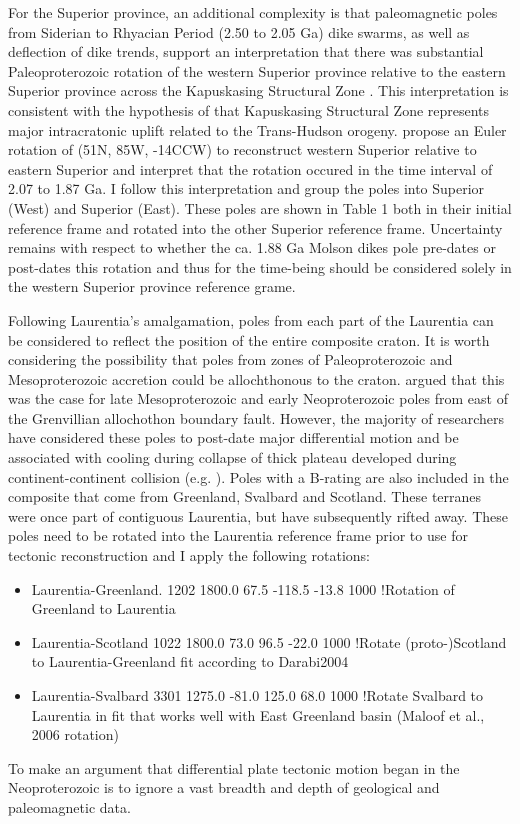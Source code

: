 \documentclass[11pt,letterpaper]{article}
\begin{document}
For the Superior province, an additional complexity is that paleomagnetic poles from Siderian to Rhyacian Period (2.50 to 2.05 Ga) dike swarms, as well as deflection of dike trends, support an interpretation that there was substantial Paleoproterozoic rotation of the western Superior province relative to the eastern Superior province across the Kapuskasing Structural Zone \citep{Bates1991a, Evans2010a}. This interpretation is consistent with the hypothesis of \citet{Hoffman1988a} that Kapuskasing Structural Zone represents major intracratonic uplift related to the Trans-Hudson orogeny. \cite{Evans2010a} propose an Euler rotation of (51\textdegree N, 85\textdegree W, -14\textdegree CCW) to reconstruct western Superior relative to eastern Superior and interpret that the rotation occured in the time interval of 2.07 to 1.87 Ga.  I follow this interpretation and group the poles into Superior (West) and Superior (East). These poles are shown in Table 1 both in their initial reference frame and rotated into the other Superior reference frame. Uncertainty remains with respect to whether the ca. 1.88 Ga Molson dikes pole pre-dates or post-dates this rotation and thus for the time-being should be considered solely in the western Superior province reference grame. 

Following Laurentia's amalgamation, poles from each part of the Laurentia can be considered to reflect the position of the entire composite craton. It is worth considering the possibility that poles from zones of Paleoproterozoic and Mesoproterozoic accretion could be allochthonous to the craton. \cite{Hall201Xa} argued that this was the case for late Mesoproterozoic and early Neoproterozoic poles from east of the Grenvillian allochothon boundary fault. However, the majority of researchers have considered these poles to post-date major differential motion and be associated with cooling during collapse of thick plateau developed during continent-continent collision (e.g. \cite{}). Poles with a B-rating are also included in the composite that come from Greenland, Svalbard and Scotland. These terranes were once part of contiguous Laurentia, but have subsequently rifted away. These poles need to be rotated into the Laurentia reference frame prior to use for tectonic reconstruction and I apply the following rotations:

\begin{itemize}
\item Laurentia-Greenland.  1202 1800.0   67.5 -118.5  -13.8  1000 !Rotation of Greenland to Laurentia
\item Laurentia-Scotland 1022 1800.0   73.0   96.5  -22.0  1000 !Rotate (proto-)Scotland to Laurentia-Greenland fit according to Darabi2004
\item Laurentia-Svalbard 3301 1275.0  -81.0  125.0   68.0  1000 !Rotate Svalbard to Laurentia in fit that works well with East Greenland basin (Maloof et al., 2006 rotation)
\end{itemize}


To make an argument that differential plate tectonic motion began in the Neoproterozoic is to ignore a vast breadth and depth of geological and paleomagnetic data.


\small
\end{document}
